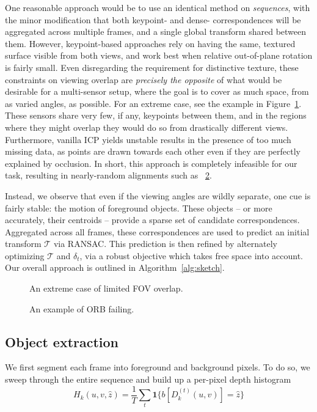 \documentclass[letterpaper, 10 pt, conference]{ieeeconf}  %
\begin{document}
One reasonable approach would be to use an identical method on \emph{sequences}, with the minor modification that both keypoint- and dense- correspondences will be aggregated across multiple frames, and
 a single global transform shared between them. However, keypoint-based approaches rely on having the same, textured surface visible from both views, and work best when relative out-of-plane rotation is fairly 
 small. Even disregarding the requirement for distinctive texture, these constraints on viewing overlap are \emph{precisely the opposite} of what would be desirable 
 for a multi-sensor setup, where the goal is to cover as much space, from as varied angles, as possible. For an extreme case, 
 see the example in Figure~\ref{fig:extreme}. These sensors share very few, if any, keypoints between them, and in the regions where they might overlap they would do so from drastically different views.
 Furthermore, vanilla ICP yields unstable results in the presence of too much missing data, as points are drawn towards each other even if they are perfectly explained by occlusion.
 In short, this approach is completely infeasible for our task, resulting in nearly-random alignments such as ~\ref{fig:orb}.

Instead, we observe that even if the viewing angles are wildly separate, one cue is fairly stable: the motion of foreground objects. These objects -- or more accurately, their centroids -- provide 
a sparse set of candidate correspondences. Aggregated across all frames, these correspondences are used to predict an initial transform $\mathcal{T}$ via RANSAC. This prediction is then refined by 
alternately optimizing $\mathcal{T}$ and $\delta_t$, via a robust objective which takes free space into account. Our overall approach is outlined in Algorithm~\ref{alg:sketch}. 

\begin{figure}
  \label{fig:extreme}
  \caption{An extreme case of limited FOV overlap.}
\end{figure}

\begin{figure}
  \label{fig:orb}
  \caption{An example of ORB failing.}
\end{figure}

\subsection{Object extraction}

We first segment each frame into foreground and background pixels. To do so, we sweep through the entire sequence and build up a per-pixel depth histogram
\begin{equation*}
  H_{k}(u, v, \hat{z}) = \frac{1}{T} \sum\limits_{t} \textbf{1}\{ b[D_{k}^{(t)}(u,v)] = \hat{z} \}
\end{equation*}
\end{document}
